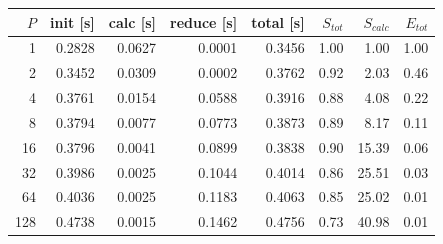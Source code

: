 \begin{tabular}{rrrrrrrr}
\hline
$P$ & init [s] & calc [s] & reduce [s] & total [s] & $S_{tot}$ & $S_{calc}$ & $E_{tot}$ \\
\hline
1 & 0.2828 & 0.0627 & 0.0001 & 0.3456 & 1.00 & 1.00 & 1.00 \\
2 & 0.3452 & 0.0309 & 0.0002 & 0.3762 & 0.92 & 2.03 & 0.46 \\
4 & 0.3761 & 0.0154 & 0.0588 & 0.3916 & 0.88 & 4.08 & 0.22 \\
8 & 0.3794 & 0.0077 & 0.0773 & 0.3873 & 0.89 & 8.17 & 0.11 \\
16 & 0.3796 & 0.0041 & 0.0899 & 0.3838 & 0.90 & 15.39 & 0.06 \\
32 & 0.3986 & 0.0025 & 0.1044 & 0.4014 & 0.86 & 25.51 & 0.03 \\
64 & 0.4036 & 0.0025 & 0.1183 & 0.4063 & 0.85 & 25.02 & 0.01 \\
128 & 0.4738 & 0.0015 & 0.1462 & 0.4756 & 0.73 & 40.98 & 0.01 \\
\hline
\end{tabular}
